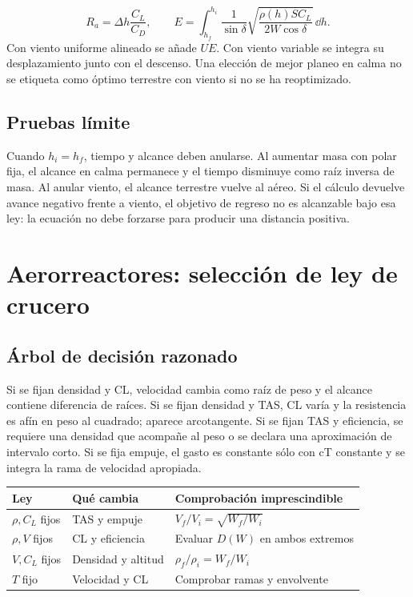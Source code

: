 \begin{equation}
R_a=\Delta h\frac{C_L}{C_D},\qquad
E=\int_{h_f}^{h_i}\frac1{\sin\delta}\sqrt{\frac{\rho(h)SC_L}{2W\cos\delta}}\,\dd h.
\end{equation}
Con viento uniforme alineado se añade $UE$. Con viento variable se integra su desplazamiento junto con el descenso. Una elección de mejor planeo en calma no se etiqueta como óptimo terrestre con viento si no se ha reoptimizado.

\section{Pruebas límite}
Cuando $h_i=h_f$, tiempo y alcance deben anularse. Al aumentar masa con polar fija, el alcance en calma permanece y el tiempo disminuye como raíz inversa de masa. Al anular viento, el alcance terrestre vuelve al aéreo. Si el cálculo devuelve avance negativo frente a viento, el objetivo de regreso no es alcanzable bajo esa ley: la ecuación no debe forzarse para producir una distancia positiva.

\chapter{Aerorreactores: selección de ley de crucero}
\section{Árbol de decisión razonado}
Si se fijan densidad y CL, velocidad cambia como raíz de peso y el alcance contiene diferencia de raíces. Si se fijan densidad y TAS, CL varía y la resistencia es afín en peso al cuadrado; aparece arcotangente. Si se fijan TAS y eficiencia, se requiere una densidad que acompañe al peso o se declara una aproximación de intervalo corto. Si se fija empuje, el gasto es constante sólo con cT constante y se integra la rama de velocidad apropiada.

\begin{center}\begin{tabular}{p{.25\linewidth}p{.28\linewidth}p{.35\linewidth}}\toprule
Ley&Qué cambia&Comprobación imprescindible\\\midrule
$\rho,C_L$ fijos&TAS y empuje&$V_f/V_i=\sqrt{W_f/W_i}$\\
$\rho,V$ fijos&CL y eficiencia&Evaluar $D(W)$ en ambos extremos\\
$V,C_L$ fijos&Densidad y altitud&$\rho_f/\rho_i=W_f/W_i$\\
$T$ fijo&Velocidad y CL&Comprobar ramas y envolvente\\\bottomrule
\end{tabular}\end{center}
